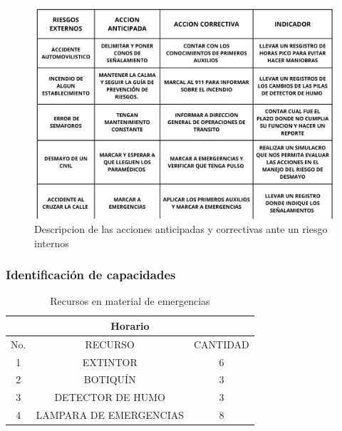     \begin{figure}[H]
        \centering
        \includegraphics[scale=0.1]{9/Img/accionesAnticipadas.pdf}
        \caption{Descripcion de las acciones anticipadas y correctivas ante un riesgo internos}
        \label{fig:mapa-itq}
    \end{figure}
    \subsubsection{Identificación de capacidades}
    \begin{table}[h]
        \centering
        \begin{tabular}{|c|c|c|}
        \hline
        \multicolumn{3}{c}{Horario}\\
        \hline
             No.& RECURSO& CANTIDAD \\
        \hline
             1 & EXTINTOR & 6\\
        \hline
             2 & BOTIQUÍN & 3\\
        \hline 
             3 & DETECTOR DE HUMO & 3\\
        \hline
             4 & LAMPARA DE EMERGENCIAS & 8\\
             \hline
        \end{tabular}
        \caption{Recursos en material de emergencias}
        \label{tab:riego}
    \end{table}
